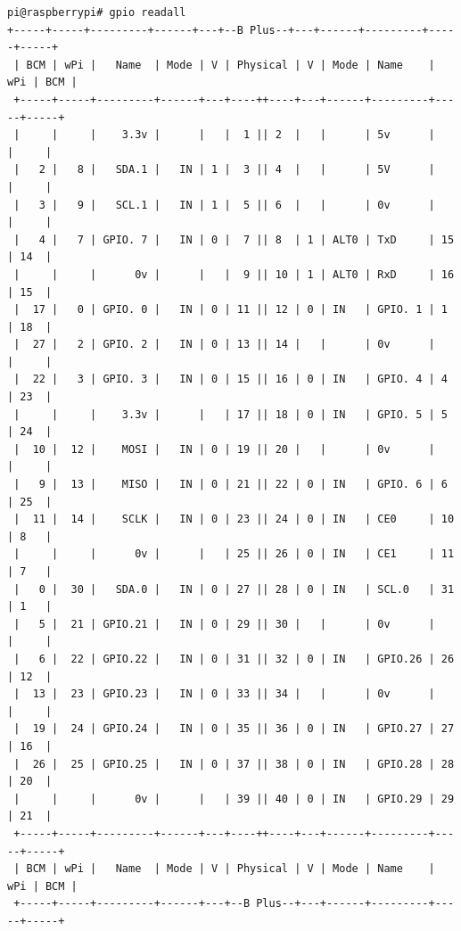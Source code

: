\documentclass[11pt
  , a4paper
  , article
  , oneside
]{memoir}
\begin{document}
\begin{lstlisting}[style=termstyle]
pi@raspberrypi# gpio readall
+-----+-----+---------+------+---+--B Plus--+---+------+---------+-----+-----+
 | BCM | wPi |   Name  | Mode | V | Physical | V | Mode | Name    | wPi | BCM |
 +-----+-----+---------+------+---+----++----+---+------+---------+-----+-----+
 |     |     |    3.3v |      |   |  1 || 2  |   |      | 5v      |     |     |
 |   2 |   8 |   SDA.1 |   IN | 1 |  3 || 4  |   |      | 5V      |     |     |
 |   3 |   9 |   SCL.1 |   IN | 1 |  5 || 6  |   |      | 0v      |     |     |
 |   4 |   7 | GPIO. 7 |   IN | 0 |  7 || 8  | 1 | ALT0 | TxD     | 15  | 14  |
 |     |     |      0v |      |   |  9 || 10 | 1 | ALT0 | RxD     | 16  | 15  |
 |  17 |   0 | GPIO. 0 |   IN | 0 | 11 || 12 | 0 | IN   | GPIO. 1 | 1   | 18  |
 |  27 |   2 | GPIO. 2 |   IN | 0 | 13 || 14 |   |      | 0v      |     |     |
 |  22 |   3 | GPIO. 3 |   IN | 0 | 15 || 16 | 0 | IN   | GPIO. 4 | 4   | 23  |
 |     |     |    3.3v |      |   | 17 || 18 | 0 | IN   | GPIO. 5 | 5   | 24  |
 |  10 |  12 |    MOSI |   IN | 0 | 19 || 20 |   |      | 0v      |     |     |
 |   9 |  13 |    MISO |   IN | 0 | 21 || 22 | 0 | IN   | GPIO. 6 | 6   | 25  |
 |  11 |  14 |    SCLK |   IN | 0 | 23 || 24 | 0 | IN   | CE0     | 10  | 8   |
 |     |     |      0v |      |   | 25 || 26 | 0 | IN   | CE1     | 11  | 7   |
 |   0 |  30 |   SDA.0 |   IN | 0 | 27 || 28 | 0 | IN   | SCL.0   | 31  | 1   |
 |   5 |  21 | GPIO.21 |   IN | 0 | 29 || 30 |   |      | 0v      |     |     |
 |   6 |  22 | GPIO.22 |   IN | 0 | 31 || 32 | 0 | IN   | GPIO.26 | 26  | 12  |
 |  13 |  23 | GPIO.23 |   IN | 0 | 33 || 34 |   |      | 0v      |     |     |
 |  19 |  24 | GPIO.24 |   IN | 0 | 35 || 36 | 0 | IN   | GPIO.27 | 27  | 16  |
 |  26 |  25 | GPIO.25 |   IN | 0 | 37 || 38 | 0 | IN   | GPIO.28 | 28  | 20  |
 |     |     |      0v |      |   | 39 || 40 | 0 | IN   | GPIO.29 | 29  | 21  |
 +-----+-----+---------+------+---+----++----+---+------+---------+-----+-----+
 | BCM | wPi |   Name  | Mode | V | Physical | V | Mode | Name    | wPi | BCM |
 +-----+-----+---------+------+---+--B Plus--+---+------+---------+-----+-----+
\end{lstlisting}
\end{document}
